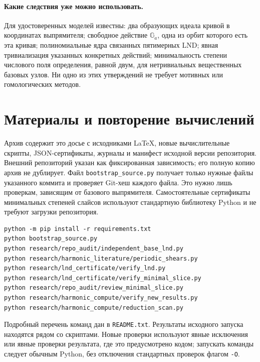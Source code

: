 \paragraph{Какие следствия уже можно использовать.}
Для удостоверенных моделей известны: два образующих идеала кривой
в координатах выпрямителя; свободное действие $\mathbb G_a$, одна
из орбит которого есть эта кривая; полиномиальные ядра связанных
пятимерных LND; явная тривиализация указанных конкретных действий;
минимальность степени числового поля определения, равной двум,
для нетривиальных вещественных базовых узлов. Ни одно из этих
утверждений не требует мотивных или гомологических методов.

\section{Материалы и повторение вычислений}

Архив содержит это досье с исходниками LaTeX, новые вычислительные
скрипты, JSON-сертификаты, журналы и манифест исходной версии репозитория.
Внешний репозиторий указан как фиксированная зависимость; его
полную копию архив не дублирует. Файл \texttt{bootstrap\_source.py}
получает только нужные файлы указанного коммита и проверяет Git-хеш
каждого файла. Это нужно лишь проверкам, зависящим от базового выпрямителя.
Самостоятельные сертификаты минимальных степеней слайсов используют
стандартную библиотеку Python и не требуют загрузки репозитория.

\begin{verbatim}
python -m pip install -r requirements.txt
python bootstrap_source.py
python research/repo_audit/independent_base_lnd.py
python research/harmonic_literature/periodic_shears.py
python research/lnd_certificate/verify_lnd.py
python research/lnd_certificate/verify_minimal_slice.py
python research/repo_audit/review_minimal_slice.py
python research/harmonic_compute/verify_new_results.py
python research/harmonic_compute/reduction_scan.py
\end{verbatim}
Подробный перечень команд дан в \texttt{README.txt}. Результаты
исходного запуска находятся рядом со скриптами. Новые проверки
используют явные исключения или явные проверки результата, где
это предусмотрено кодом; запускать команды следует обычным Python,
без отключения стандартных проверок флагом \texttt{-O}.

